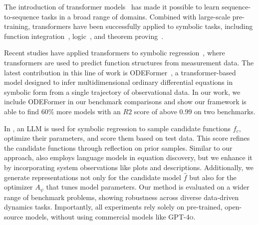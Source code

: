 The introduction of transformer models~\cite{Vaswani17} has made it possible to learn sequence-to-sequence tasks in a broad range of domains. 
Combined with large-scale pre-training, transformers have been successfully applied to symbolic tasks, including 
function integration~\cite{Lample2020Deep}, 
logic~\cite{hahn2021teaching}, and theorem proving~\cite{polu2020}.

Recent studies have applied transformers to symbolic regression~\cite{kamienny2022endtoend, Landajuela22, Vastl24}, where transformers are used to predict function structures from measurement data. 
The latest contribution in this line of work is ODEFormer~\cite{ascoli2024odeformer}, a transformer-based model designed to infer multidimensional ordinary differential equations in symbolic form from a single trajectory of observational data. 
In our work, we include ODEFormer in our benchmark comparisons and show our framework is able to find $60\%$ more models with an $R2$ score of above 0.99 on two benchmarks.

In \cite{Mengge24}, an LLM is used for symbolic regression to sample candidate functions $f_c$, optimize their parameters, and score them based on test data. 
This score refines the candidate functions through reflection on prior samples. 
Similar to our approach, \cite{Mengge24} also employs language models in equation discovery, but we enhance it by incorporating system observations like plots and descriptions. 
Additionally, we generate representations not only for the candidate model $\widehat{f}$ but also for the optimizer $A_\psi$ that tunes model parameters. 
Our method is evaluated on a wider range of benchmark problems, showing robustness across diverse data-driven dynamics tasks. 
Importantly, all experiments rely solely on pre-trained, open-source models, without using commercial models like \textsc{GPT-4o}.